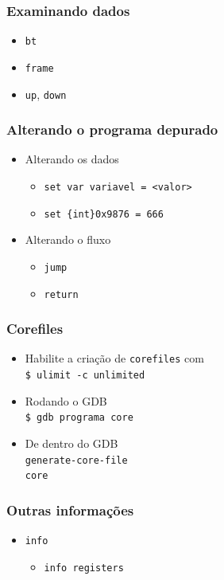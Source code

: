 \documentclass[xcolor=pdftex,dvipsnames,table,t]{beamer}
\begin{document}
\begin{frame}
	\frametitle{Examinando dados}
	  \begin{itemize}
	    \item \texttt{bt}
	    \item \texttt{frame}
	    \item \texttt{up}, \texttt{down}
	  \end{itemize}
\end{frame}

\begin{frame}
	\frametitle{Alterando o programa depurado}
	  \begin{itemize}
	    \item Alterando os dados
	      \begin{itemize}
		\item \texttt{set var variavel = <valor>}
		\item \texttt{set \{int\}0x9876 = 666}
	      \end{itemize}
	    \item Alterando o fluxo
	      \begin{itemize}
		\item \texttt{jump}
		\item \texttt{return}
	      \end{itemize}
	  \end{itemize}
\end{frame}

\begin{frame}
	\frametitle{Corefiles} %
	  \begin{itemize}
	  \item Habilite a criação de \texttt{corefiles} com \\
		\texttt{\$ ulimit -c unlimited}
	  \item Rodando o GDB \\
		\texttt{\$ gdb programa core}
	  \item De dentro do GDB \\
		\texttt{generate-core-file} \\
		\texttt{core}
	  \end{itemize}
\end{frame}

\begin{frame}
	\frametitle{Outras informações}
	  \begin{itemize}
	    \item \texttt{info}
	    \begin{itemize}
	      \item \texttt{info registers}
	    \end{itemize}
	  \end{itemize}
\end{frame}
\end{document}
